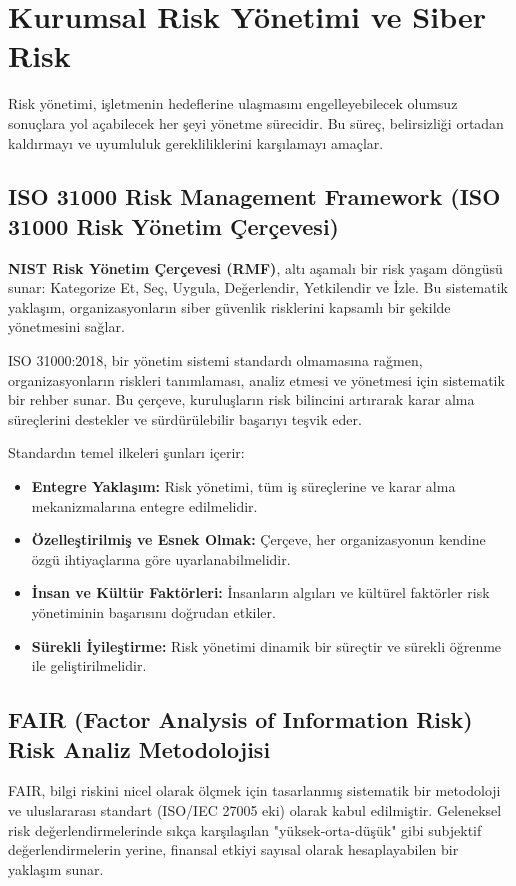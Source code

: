 \section{Kurumsal Risk Yönetimi ve Siber Risk}

Risk yönetimi, işletmenin hedeflerine ulaşmasını engelleyebilecek olumsuz sonuçlara yol açabilecek her şeyi yönetme sürecidir. Bu süreç, belirsizliği ortadan kaldırmayı ve uyumluluk gerekliliklerini karşılamayı amaçlar.

\subsection{ISO 31000 Risk Management Framework (ISO 31000 Risk Yönetim Çerçevesi)}

\textbf{NIST Risk Yönetim Çerçevesi (RMF)}, altı aşamalı bir risk yaşam döngüsü sunar: Kategorize Et, Seç, Uygula, Değerlendir, Yetkilendir ve İzle. Bu sistematik yaklaşım, organizasyonların siber güvenlik risklerini kapsamlı bir şekilde yönetmesini sağlar.

ISO 31000:2018, bir yönetim sistemi standardı olmamasına rağmen, organizasyonların riskleri tanımlaması, analiz etmesi ve yönetmesi için sistematik bir rehber sunar. Bu çerçeve, kuruluşların risk bilincini artırarak karar alma süreçlerini destekler ve sürdürülebilir başarıyı teşvik eder.

Standardın temel ilkeleri şunları içerir:
\begin{itemize}
    \item \textbf{Entegre Yaklaşım:} Risk yönetimi, tüm iş süreçlerine ve karar alma mekanizmalarına entegre edilmelidir.
    \item \textbf{Özelleştirilmiş ve Esnek Olmak:} Çerçeve, her organizasyonun kendine özgü ihtiyaçlarına göre uyarlanabilmelidir.
    \item \textbf{İnsan ve Kültür Faktörleri:} İnsanların algıları ve kültürel faktörler risk yönetiminin başarısını doğrudan etkiler.
    \item \textbf{Sürekli İyileştirme:} Risk yönetimi dinamik bir süreçtir ve sürekli öğrenme ile geliştirilmelidir.
\end{itemize}

\subsection{FAIR (Factor Analysis of Information Risk) Risk Analiz Metodolojisi}

FAIR, bilgi riskini nicel olarak ölçmek için tasarlanmış sistematik bir metodoloji ve uluslararası standart (ISO/IEC 27005 eki) olarak kabul edilmiştir. Geleneksel risk değerlendirmelerinde sıkça karşılaşılan "yüksek-orta-düşük" gibi subjektif değerlendirmelerin yerine, finansal etkiyi sayısal olarak hesaplayabilen bir yaklaşım sunar.

